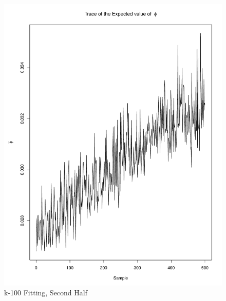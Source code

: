 \documentclass[11pt]{labbook}
\begin{document}
    \begin{figure}
        \centering
        \includegraphics[scale=.65]{FONSE_Plots/2016/December_14/k-100_expectedPhi_final}
        \caption{k-100 Fitting, Second Half}
        \label{fig:k-100_2EPHI}
    \end{figure}
\end{document}
